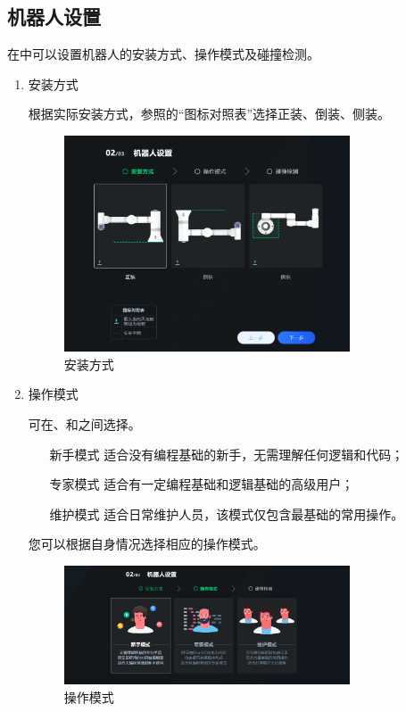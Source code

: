 \subsection{机器人设置}
在中可以设置机器人的安装方式、操作模式及碰撞检测。
\begin{enumerate}
\item 安装方式

	根据实际安装方式，参照的“图标对照表”选择正装、倒装、侧装。

	\begin{figure}[ht]
		\centering
		\includegraphics[width=0.8\textwidth]{screen/2-6.png}
		\caption{安装方式}
		\label{fig:安装方式}
	\end{figure}



\item 操作模式

可在、和之间选择。 
\begin{itemize}
\item[新手模式] 适合没有编程基础的新手，无需理解任何逻辑和代码；
\item[专家模式] 适合有一定编程基础和逻辑基础的高级用户；
\item[维护模式] 适合日常维护人员，该模式仅包含最基础的常用操作。
\end{itemize}
您可以根据自身情况选择相应的操作模式。 

	\begin{figure}[ht]
		\centering
		\includegraphics[width=0.8\textwidth]{image/07/图2.7 操作模式.png}
		\caption{操作模式}
		\label{fig:操作模式}
	\end{figure}


\end{enumerate}
